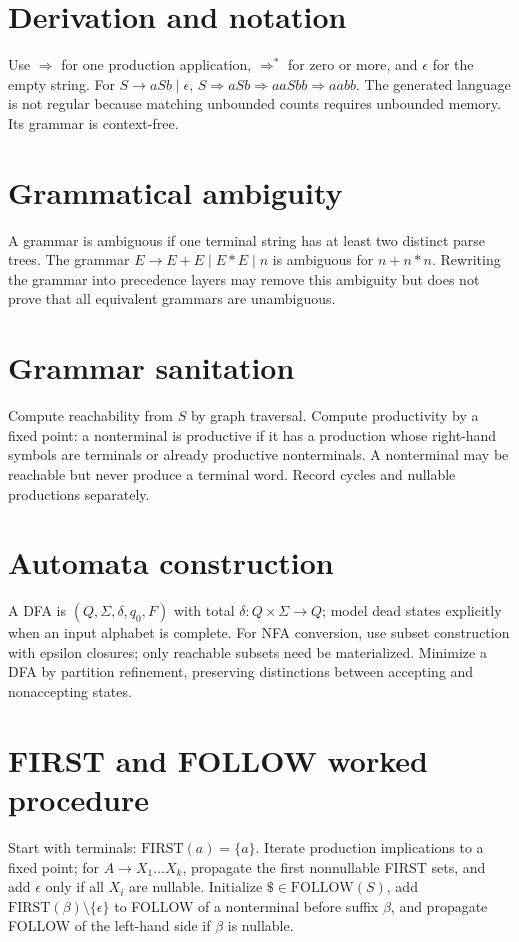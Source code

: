 \documentclass[11pt,letterpaper]{article}
\begin{document}
\makedoctitle\makedocsummary
\tableofcontents\clearpage

\section{Derivation and notation}
Use $\Rightarrow$ for one production application, $\Rightarrow^*$ for zero or more, and $\epsilon$ for the empty string. For $S\to aSb\mid\epsilon$, $S\Rightarrow aSb\Rightarrow aaSbb\Rightarrow aabb$. The generated language is not regular because matching unbounded counts requires unbounded memory. Its grammar is context-free.
\section{Grammatical ambiguity}
A grammar is ambiguous if one terminal string has at least two distinct parse trees. The grammar $E\to E+E\mid E*E\mid n$ is ambiguous for $n+n*n$. Rewriting the grammar into precedence layers may remove this ambiguity but does not prove that all equivalent grammars are unambiguous.
\section{Grammar sanitation}
Compute reachability from $S$ by graph traversal. Compute productivity by a fixed point: a nonterminal is productive if it has a production whose right-hand symbols are terminals or already productive nonterminals. A nonterminal may be reachable but never produce a terminal word. Record cycles and nullable productions separately.
\section{Automata construction}
A DFA is $(Q,\Sigma,\delta,q_0,F)$ with total $\delta:Q\times\Sigma\to Q$; model dead states explicitly when an input alphabet is complete. For NFA conversion, use subset construction with epsilon closures; only reachable subsets need be materialized. Minimize a DFA by partition refinement, preserving distinctions between accepting and nonaccepting states.
\section{FIRST and FOLLOW worked procedure}
Start with terminals: $\mathrm{FIRST}(a)=\{a\}$. Iterate production implications to a fixed point; for $A\to X_1\ldots X_k$, propagate the first nonnullable FIRST sets, and add $\epsilon$ only if all $X_i$ are nullable. Initialize $\$\in\mathrm{FOLLOW}(S)$, add $\mathrm{FIRST}(\beta)\setminus\{\epsilon\}$ to FOLLOW of a nonterminal before suffix $\beta$, and propagate FOLLOW of the left-hand side if $\beta$ is nullable.
\end{document}

